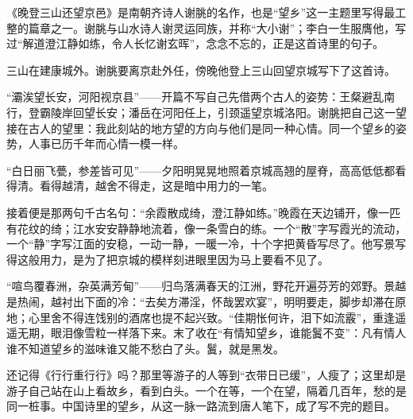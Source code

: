 \begin{appreciation}
《晚登三山还望京邑》是南朝齐诗人谢朓的名作，也是“望乡”这一主题里写得最工整的篇章之一。谢朓与山水诗人谢灵运同族，并称“大小谢”；李白一生服膺他，写过“解道澄江静如练，令人长忆谢玄晖”，念念不忘的，正是这首诗里的句子。

三山在建康城外。谢朓要离京赴外任，傍晚他登上三山回望京城写下了这首诗。

“灞涘望长安，河阳视京县”——开篇不写自己先借两个古人的姿势：王粲避乱南行，登霸陵岸回望长安；潘岳在河阳任上，引颈遥望京城洛阳。谢朓把自己这一望接在古人的望里：我此刻站的地方望的方向与他们是同一种心情。同一个望乡的姿势，人事已历千年而心情一模一样。

“白日丽飞甍，参差皆可见”——夕阳明晃晃地照着京城高翘的屋脊，高高低低都看得清。看得越清，越舍不得走，这是暗中用力的一笔。

接着便是那两句千古名句：“余霞散成绮，澄江静如练。”晚霞在天边铺开，像一匹有花纹的绮；江水安安静静地流着，像一条雪白的练。一个“散”字写霞光的流动，一个“静”字写江面的安稳，一动一静，一暖一冷，十个字把黄昏写尽了。他写景写得这般用力，是为了把京城的模样刻进眼里因为马上要看不见了。

“喧鸟覆春洲，杂英满芳甸”——归鸟落满春天的江洲，野花开遍芬芳的郊野。景越是热闹，越衬出下面的冷：“去矣方滞淫，怀哉罢欢宴”，明明要走，脚步却滞在原地；心里舍不得连饯别的酒席也提不起兴致。“佳期怅何许，泪下如流霰”，重逢遥遥无期，眼泪像雪粒一样落下来。末了收在“有情知望乡，谁能鬒不变”：凡有情人谁不知道望乡的滋味谁又能不愁白了头。鬒，就是黑发。

还记得《行行重行行》吗？那里等游子的人等到“衣带日已缓”，人瘦了；这里却是游子自己站在山上看故乡，看到白头。一个在等，一个在望，隔着几百年，愁的是同一桩事。中国诗里的望乡，从这一脉一路流到唐人笔下，成了写不完的题目。
\end{appreciation}
